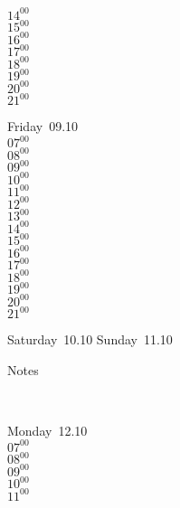 \documentclass[11pt,a4paper]{book}\usepackage[]{graphicx}\usepackage[]{color}
\begin{document}
{{{{{{{{{{{{{{\begin{tcolorbox}
{$14^{00}$\\
$15^{00}$\\
$16^{00}$\\
$17^{00}$\\
$18^{00}$\\
$19^{00}$\\
$20^{00}$\\
$21^{00}$}\\
\end{tcolorbox} 
%
\begin{tcolorbox}
Friday~09.10\\
{ 
$07^{00}$\\
$08^{00}$\\
$09^{00}$\\
$10^{00}$\\
$11^{00}$\\
$12^{00}$\\
$13^{00}$\\
$14^{00}$\\
$15^{00}$\\
$16^{00}$\\
$17^{00}$\\
$18^{00}$\\
$19^{00}$\\
$20^{00}$\\
$21^{00}$}\\
\end{tcolorbox} 
%
\begin{tcolorbox}[height=(\textheight-10mm)/6]
Saturday~10.10
\tcblower
Sunday~11.10
\end{tcolorbox} %
%
\begin{tcolorbox}[height=(\textheight-10mm)/6,sidebyside=false]
Notes
\end{tcolorbox}
\clearpage
\vspace{2 mm}\\
%
%
\begin{tcolorbox}
Monday~12.10\\
{ 
$07^{00}$\\
$08^{00}$\\
$09^{00}$\\
$10^{00}$\\
$11^{00}$\\
}
\end{tcolorbox}}}}}}}}}}}}}}}
\end{document}
